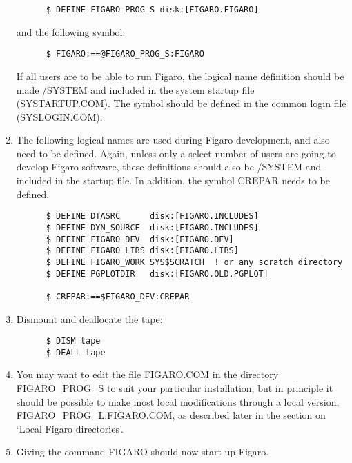 \begin{enumerate}
\begin{verbatim}
      $ DEFINE FIGARO_PROG_S disk:[FIGARO.FIGARO]
\end{verbatim}

and the following symbol:

\begin{verbatim}
      $ FIGARO:==@FIGARO_PROG_S:FIGARO
\end{verbatim}

If all users are to be able to run Figaro, the  logical  name definition
should be made /SYSTEM and included in the system startup file (SYSTARTUP.COM).
The symbol should  be  defined in the common login file (SYSLOGIN.COM).

\item The  following  logical  names are used during Figaro development, and
also need to be defined.  Again, unless only a  select  number  of  users  are
going  to  develop  Figaro software,  these  definitions  should  also  be
/SYSTEM  and included in the startup file.  In addition, the symbol CREPAR
needs to be defined.

\begin{verbatim}
      $ DEFINE DTASRC      disk:[FIGARO.INCLUDES]
      $ DEFINE DYN_SOURCE  disk:[FIGARO.INCLUDES]
      $ DEFINE FIGARO_DEV  disk:[FIGARO.DEV]
      $ DEFINE FIGARO_LIBS disk:[FIGARO.LIBS]
      $ DEFINE FIGARO_WORK SYS$SCRATCH  ! or any scratch directory
      $ DEFINE PGPLOTDIR   disk:[FIGARO.OLD.PGPLOT]

      $ CREPAR:==$FIGARO_DEV:CREPAR
\end{verbatim}

\item Dismount and deallocate the tape:

\begin{verbatim}
      $ DISM tape
      $ DEALL tape
\end{verbatim}

\item You may want to edit the file  FIGARO.COM  in  the  directory
FIGARO\_PROG\_S  to  suit  your particular installation, but in principle  it
should  be  possible  to make most local modifications   through
a   local  version, FIGARO\_PROG\_L:FIGARO.COM, as described later in
the  section on `Local Figaro directories'.

\item Giving the command FIGARO should now start up Figaro.

\end{enumerate}

